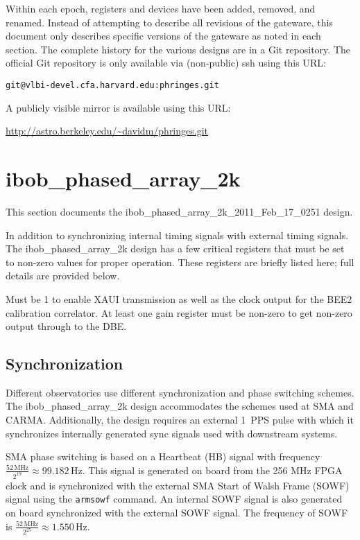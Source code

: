 \documentclass[12pt]{article}
\begin{document}
Within each epoch, registers and devices have been added, removed, and renamed.
Instead of attempting to describe all revisions of the gateware, this document
only describes specific versions of the gateware as noted in each section.  The
complete history for the various designs are in a Git repository.  The official
Git repository is only available via (non-public) ssh using this URL:

\begin{center}
\nolinkurl{git@vlbi-devel.cfa.harvard.edu:phringes.git}
\end{center}

A publicly visible mirror is available using this URL:

\begin{center}
\url{http://astro.berkeley.edu/~davidm/phringes.git}
\end{center}

\section{ibob\_phased\_array\_2k}

This section documents the ibob\_phased\_array\_2k\_2011\_Feb\_17\_0251 design.

In addition to synchronizing internal timing signals with external timing
signals.  The ibob\_phased\_array\_2k design has a few critical registers that
must be set to non-zero values for proper operation.  These registers are
briefly listed here; full details are provided below.

\begin{description}
 Must be 1 to enable XAUI transmission as well as the clock
output for the BEE2 calibration correlator.
 At least one gain register must be non-zero to get
non-zero output through to the DBE.
\end{description}

  \subsection{Synchronization}

Different observatories use different synchronization and phase switching
schemes.  The ibob\_phased\_array\_2k design accommodates the schemes used at
SMA and CARMA.  Additionally, the design requires an external 1~PPS pulse with
which it synchronizes internally generated sync signals used with downstream
systems.

SMA phase switching is based on a Heartbeat (HB) signal with frequency
$\frac{52 \, \mathrm{MHz}}{2^{19}} \approx 99.182 \, \mathrm{Hz}$.  This signal
is generated on board from the 256 MHz FPGA clock and is synchronized with the
external SMA Start of Walsh Frame (SOWF) signal using the \verb|armsowf|
command.  An internal SOWF signal is also generated on board synchronized with
the external SOWF signal.  The frequency of SOWF is $\frac{52 \,
\mathrm{MHz}}{2^{25}} \approx 1.550 \, \mathrm{Hz}$.
\end{document}
